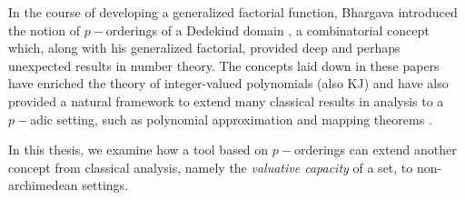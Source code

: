 
In the course of developing a generalized factorial function, Bhargava introduced the notion of $p-$orderings of a Dedekind domain \cite{mb1, mb2}, a combinatorial concept which, along with his generalized factorial, provided deep and perhaps unexpected results in number theory. The concepts laid down in these papers have enriched the theory of integer-valued polynomials \cite{mb3} (also KJ) and have also provided a natural framework to extend many classical results in analysis to a $p-$adic setting, such as polynomial approximation and mapping theorems \cite{mb1, mb2,mb3}.

In this thesis, we examine how a tool based on $p-$orderings can extend another concept from classical analysis, namely the \textit{valuative capacity} of a set, to non-archimedean settings.